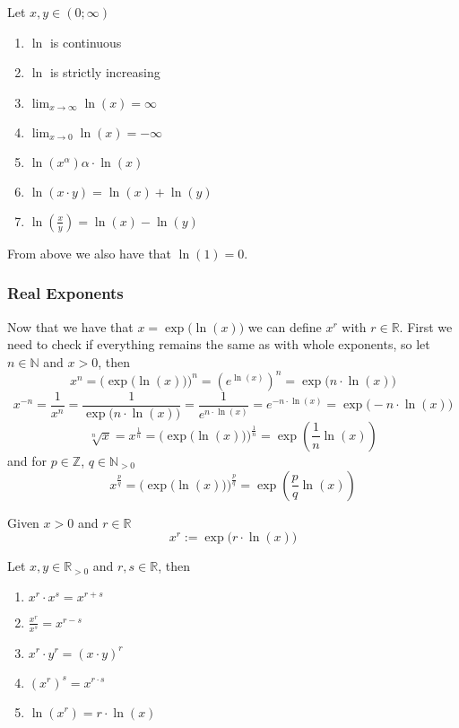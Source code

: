 \begin{proposition}[Properties]
   Let \(x, y \in (0; \infty)\)
   \begin{enumerate}[label=\roman*, align=Center]
      \item \(\ln\) is continuous
      \item \(\ln\) is strictly increasing
      \item \(\lim_{x \to \infty} \ln(x) = \infty\)
      \item \(\lim_{x \to 0} \ln(x) = -\infty\)
      \item \(\ln(x^\alpha) \alpha \cdot \ln(x)\)
      \item \(\ln(x \cdot y) = \ln(x) + \ln(y)\)
      \item \(\ln\left(\frac{x}{y}\right) = \ln(x) - \ln(y)\)
   \end{enumerate}
\end{proposition}
\begin{remark}
   From above we also have that \(\ln(1) = 0\).
\end{remark}

\subsubsection{Real Exponents}
Now that we have that \(x = \exp\big(\ln(x)\big)\) we can define \(x^r\) with \(r \in \mathbb{R}\).
First we need to check if everything remains the same as with whole exponents, so let \(n \in \mathbb{N}\) and \(x > 0\), then
\[x^n = \Big(\exp\big(\ln(x)\big)\Big)^n = \left(e^{\ln(x)}\right)^n = \exp\big(n \cdot \ln(x)\big)\]
\[x^{-n} = \frac{1}{x^n} = \frac{1}{\exp\big(n \cdot \ln(x)\big)} = \frac{1}{e^{n \cdot \ln(x)}} = e^{-n \cdot \ln(x)} = \exp\big(-n \cdot \ln(x)\big)\]
\[\sqrt[n]{x} = x^{\frac{1}{n}} = \Big(\exp\big(\ln(x)\big)\Big)^\frac{1}{n} = \exp\left(\frac{1}{n} \ln(x)\right)\]
and for \(p \in \mathbb{Z}\), \(q \in \mathbb{N}_{>0}\)
\[x^\frac{p}{q} = \Big(\exp\big(\ln(x)\big)\Big)^\frac{p}{q} = \exp\left(\frac{p}{q} \ln(x)\right)\]

\begin{definition}\label{def:real_exponents}
   Given \(x > 0\) and \(r \in \mathbb{R}\)
   \[x^r := \exp\big(r \cdot \ln(x)\big)\]
\end{definition}

\begin{proposition}
   Let \(x, y \in \mathbb{R}_{>0}\) and \(r, s \in \mathbb{R}\), then
   \begin{enumerate}[label=\roman*, align=Center]
      \item \(x^r \cdot x^s = x^{r + s}\)
      \item \(\frac{x^r}{x^s} = x^{r-s}\)
      \item \(x^r \cdot y^r = (x \cdot y)^r\)
      \item \((x^r)^s = x^{r \cdot s}\)
      \item \(\ln(x^r) = r \cdot \ln(x)\)
   \end{enumerate}
\end{proposition}

